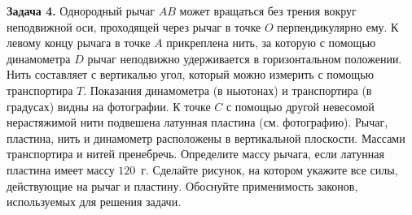 \begin{taskbasic}[code={\label{task:mechanics_v10_n26_fixed}}]
\textbf{Задача 4.} Однородный рычаг $AB$ может вращаться без трения вокруг неподвижной оси, проходящей через рычаг в точке $O$ перпендикулярно ему. К левому концу рычага в точке $A$ прикреплена нить, за которую с помощью динамометра $D$ рычаг неподвижно удерживается в горизонтальном положении. Нить составляет с вертикалью угол, который можно измерить с помощью транспортира $T$. Показания динамометра (в ньютонах) и транспортира (в градусах) видны на фотографии. К точке $C$ с помощью другой невесомой нерастяжимой нити подвешена латунная пластина (см. фотографию). Рычаг, пластина, нить и динамометр расположены в вертикальной плоскости. Массами транспортира и нитей пренебречь. Определите массу рычага, если латунная пластина имеет массу $120$~г. Сделайте рисунок, на котором укажите все силы, действующие на рычаг и пластину. Обоснуйте применимость законов, используемых для решения задачи.

\nopagebreak\smallskip
\begin{center}
\end{center}

\end{taskbasic}

